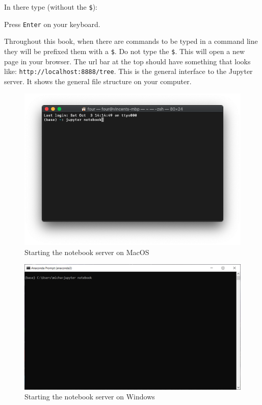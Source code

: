 In there type (without the \texttt{\$}):


Press \texttt{Enter} on your keyboard.

\begin{note}
Throughout this book, when there are commands to be typed in a command line
they will be prefixed them with a \texttt{\$}. Do not type the \texttt{\$}.
This will open a new page in your browser. The url bar at the top should have
something that looks like: \texttt{http://localhost:8888/tree}.
This is the general interface to the Jupyter server. It shows the general file
structure on your computer.
\end{note}

\begin{figure}[htbp]
\centering

    \includegraphics[width=0.750\linewidth]{assets/starting_the_notebook_server/main.png}
    \caption{Starting the notebook server on
    MacOS}\label{fig:starting-the-notebook-server}
\end{figure}

\begin{figure}[htbp]
\centering

    \includegraphics[width=0.750\linewidth]{assets/starting_the_notebook_server_windows/main.png}
    \caption{Starting the notebook server on
    Windows}\label{fig:starting-the-notebook-server-windows}
\end{figure}

